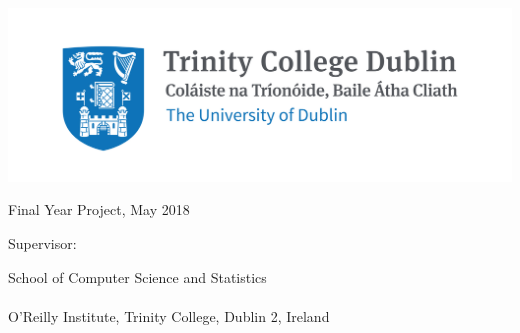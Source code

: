 \thispagestyle{empty}
\begin{center}
{\sffamily
\vspace{10pt}

\includegraphics{trinity-common-use.jpg}

\vspace{90pt}

\textbf{ \Large \emph \projecttitle}

\vspace{30pt}

\authorname

\degreetitle

Final Year Project, May 2018

Supervisor: \supervisorname

\vspace{130pt}

\large{School of Computer Science and Statistics
\\$ $\\
O'Reilly Institute, Trinity College, Dublin 2, Ireland}
\linespread{1}
}
\end{center}

